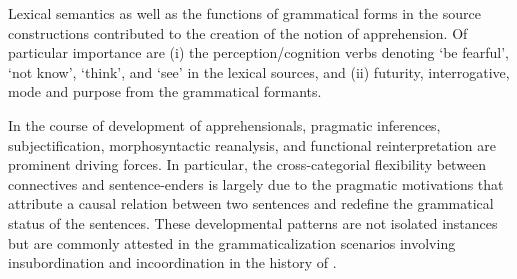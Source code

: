 \documentclass[output=paper,colorlinks,citecolor=brown]{langscibook}
\begin{document}
Lexical semantics as well as the functions of grammatical forms in the source constructions contributed to the creation of the notion of apprehension. Of particular importance are (i) the perception/cognition verbs denoting `be fearful', `not know', `think', and `see' in the lexical sources, and (ii) futurity, interrogative, mode and purpose from the grammatical formants.

In the course of development of apprehensionals, pragmatic inferences, subjectification, morphosyntactic reanalysis, and functional reinterpretation are prominent driving forces. In particular, the cross-categorial flexibility between connectives and sentence-enders is largely due to the pragmatic motivations that attribute a causal relation between two sentences and redefine the grammatical status of the sentences. These developmental patterns are not isolated instances but are commonly attested in the grammaticalization scenarios involving insubordination and incoordination in the history of . 
\end{document}
